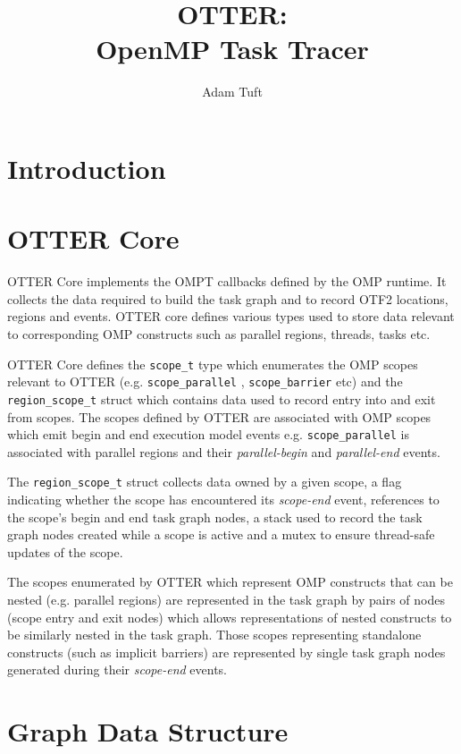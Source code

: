 \documentclass[11pt,a4paper]{article}
\title{OTTER:\\OpenMP Task Tracer}
\newcommand{\code}[1]{\texttt{#1} }
\begin{document}
\author{Adam Tuft}
\maketitle

\section{Introduction}

\section{OTTER Core}

OTTER Core implements the OMPT callbacks defined by the OMP runtime. It collects the data required to build the task graph and to record OTF2 locations, regions and events. OTTER core defines various types used to store data relevant to corresponding OMP constructs such as parallel regions, threads, tasks etc.

OTTER Core defines the \code{scope\_t} type which enumerates the OMP scopes relevant to OTTER (e.g. \code{scope\_parallel}, \code{scope\_barrier} etc) and the \code{region\_scope\_t} struct which contains data used to record entry into and exit from scopes. The scopes defined by OTTER are associated with OMP scopes which emit begin and end execution model events e.g. \code{scope\_parallel} is associated with parallel regions and their \emph{parallel-begin} and \emph{parallel-end} events.

The \code{region\_scope\_t} struct collects data owned by a given scope, a flag indicating whether the scope has encountered its \emph{scope-end} event, references to the scope's begin and end task graph nodes, a stack used to record the task graph nodes created while a scope is active and a mutex to ensure thread-safe updates of the scope.

The scopes enumerated by OTTER which represent OMP constructs that can be nested (e.g. parallel regions) are represented in the task graph by pairs of nodes (scope entry and exit nodes) which allows representations of nested constructs to be similarly nested in the task graph. Those scopes representing standalone constructs (such as implicit barriers) are represented by single task graph nodes generated during their \emph{scope-end} events.

\section{Graph Data Structure}
\end{document}
